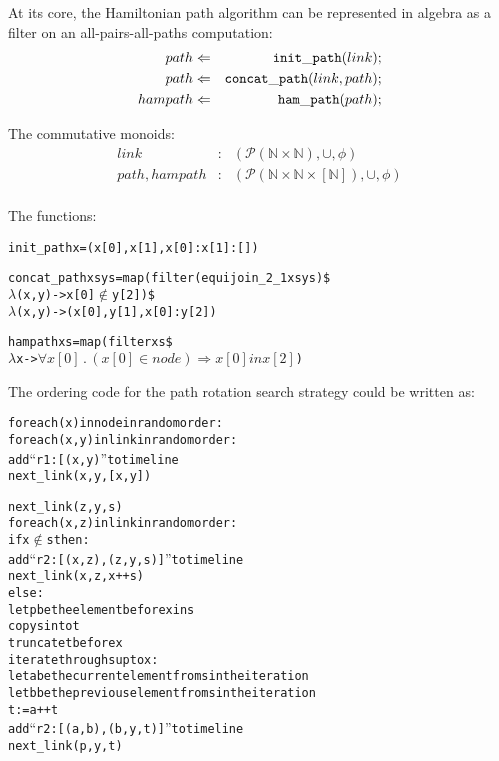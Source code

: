 At its core, the Hamiltonian path algorithm can be represented in algebra as a filter on an all-pairs-all-paths computation:
\begin{eqnarray*}
path &\Leftarrow& {\tt init\_path}(link); \\
path &\Leftarrow& {\tt concat\_path}(link, path); \\
hampath &\Leftarrow& {\tt ham\_path}(path);
\end{eqnarray*}

The commutative monoids:
\begin{eqnarray*}
link &:& \left(\mathcal{P}(\mathbb{N} \times \mathbb{N}), \cup, \phi\right) \\
path, hampath &:& \left(\mathcal{P}(\mathbb{N} \times \mathbb{N} \times [\mathbb{N}]), \cup, \phi\right) \\
\end{eqnarray*}

The functions:
\begin{alltt}
init_path x = (x[0], x[1], x[0]:x[1]:[])

concat_path xs ys = map (filter (equijoin_2_1 xs ys) \$
    \(\lambda\)(x,y) -> x[0] \(\not\in\) y[2]) \$
        \(\lambda\)(x,y) -> (x[0], y[1], x[0]:y[2])

hampath xs = map (filter xs \$
    \(\lambda\)x -> \(\forall x[0] \, . \, (x[0] \in node) \Rightarrow x[0] in x[2]\))
\end{alltt}


The ordering code for the path rotation search strategy could be written as:

\begin{alltt}
for each (x) in node in random order:
   for each (x,y) in link in random order:
      add ``r1:[(x,y)'' to timeline
      next_link(x,y,[x,y])

next_link(z,y,s)
   for each (x,z) in link in random order:
      if x \(\not\in\) s then:
         add ``r2: [(x,z), (z,y,s)]'' to timeline
         next_link(x,z,x++s)
      else:
         let p be the element before x in s
         copy s into t
         truncate t before x
         iterate through s up to x:
            let a be the current element from s in the iteration
            let b be the previous element from s in the iteration
            t := a ++ t
            add ``r2: [(a,b), (b,y,t)]'' to timeline
         next_link(p,y,t)
\end{alltt}

